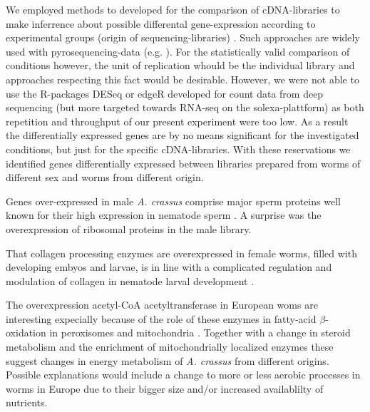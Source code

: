 \documentclass[10pt]{bmc_article}
\newenvironment{bmcformat}{\begin{raggedright}\baselineskip20pt\sloppy\setboolean{publ}{false}}{\end{raggedright}\baselineskip20pt\sloppy}
\begin{document}
\begin{bmcformat}
We employed methods to developed for the comparison of cDNA-libraries
to make inferrence about possible differental gene-expression
according to experimental groups (origin of sequencing-libraries)
\cite{pmid9331369}. Such approaches are widely used with
pyrosequencing-data (e.g. \cite{pmid20470405}). For the statistically
valid comparison of conditions however, the unit of replication whould
be the individual library and approaches respecting this fact would be
desirable. However, we were not able to use the R-packages DESeq
\cite{pmid20979621} or edgeR \cite{pmid19910308} developed for count
data from deep sequencing (but more targeted towards RNA-seq on the
solexa-plattform) as both repetition and throughput of our present
experiment were too low. As a result the differentially expressed
genes are by no means significant for the investigated conditions, but
just for the specific cDNA-libraries. With these reservations we
identified genes differentially expressed between libraries prepared
from worms of different sex and worms from different origin.

Genes over-expressed in male \textit{A. crassus} comprise major sperm
proteins well known for their high expression in nematode sperm
\cite{pmid15275275}. A surprise was the overexpression of ribosomal
proteins in the male library.

That collagen processing enzymes are overexpressed in female worms,
filled with developing embyos and larvae, is in line with a
complicated regulation and modulation of collagen in nematode larval
development \cite{pmid10637627}.

The overexpression acetyl-CoA acetyltransferase in European woms are
interesting expecially because of the role of these enzymes in
fatty-acid $\beta$-oxidation in peroxisomes and mitochondria
\cite{pmid4721607}. Together with a change in steroid metabolism and
the enrichment of mitochondrially localized enzymes these suggest
changes in energy metabolism of \textit{A. crassus} from different
origins. Possible explanations would include a change to more or less
aerobic processes in worms in Europe due to their bigger size and/or
increased availablilty of nutrients.


\end{bmcformat}
\end{document}
